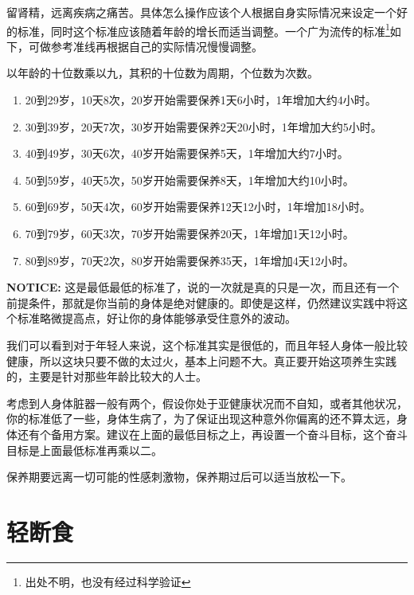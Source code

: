 \documentclass[12pt,oneside]{book}
\begin{document}
留肾精，远离疾病之痛苦。具体怎么操作应该个人根据自身实际情况来设定一个好的标准，同时这个标准应该随着年龄的增长而适当调整。一个广为流传的标准\footnote{出处不明，也没有经过科学验证}如下，可做参考准线再根据自己的实际情况慢慢调整。

以年龄的十位数乘以九，其积的十位数为周期，个位数为次数。

\begin{enumerate}
\item 20到29岁，10天8次，20岁开始需要保养1天6小时，1年增加大约4小时。
\item 30到39岁，20天7次，30岁开始需要保养2天20小时，1年增加大约5小时。
\item 40到49岁，30天6次，40岁开始需要保养5天，1年增加大约7小时。
\item 50到59岁，40天5次，50岁开始需要保养8天，1年增加大约10小时。
\item 60到69岁，50天4次，60岁开始需要保养12天12小时，1年增加18小时。
\item 70到79岁，60天3次，70岁开始需要保养20天，1年增加1天12小时。
\item 80到89岁，70天2次，80岁开始需要保养35天，1年增加4天12小时。
\end{enumerate}

\textbf{NOTICE:} 这是最低最低的标准了，说的一次就是真的只是一次，而且还有一个前提条件，那就是你当前的身体是绝对健康的。即使是这样，仍然建议实践中将这个标准略微提高点，好让你的身体能够承受住意外的波动。

我们可以看到对于年轻人来说，这个标准其实是很低的，而且年轻人身体一般比较健康，所以这块只要不做的太过火，基本上问题不大。真正要开始这项养生实践的，主要是针对那些年龄比较大的人士。

考虑到人身体脏器一般有两个，假设你处于亚健康状况而不自知，或者其他状况，你的标准低了一些，身体生病了，为了保证出现这种意外你偏离的还不算太远，身体还有个备用方案。建议在上面的最低目标之上，再设置一个奋斗目标，这个奋斗目标是上面最低标准再乘以二。

保养期要远离一切可能的性感刺激物，保养期过后可以适当放松一下。


\chapter{轻断食}
\end{document}
